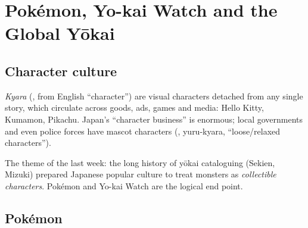\chapter{Pokémon, Yo-kai Watch and the Global Yōkai}

\section{Character culture}

\begin{definition}[Kyara]
\emph{Kyara} (, from English ``character'') are visual characters detached from
any single story, which circulate across goods, ads, games and media: Hello Kitty,
Kumamon, Pikachu. Japan's ``character business'' is enormous; local governments and even
police forces have mascot characters (, yuru-kyara, ``loose/relaxed
characters'').
\end{definition}

The theme of the last week: the long history of yōkai cataloguing (Sekien, Mizuki) prepared
Japanese popular culture to treat monsters as \emph{collectible characters}. Pokémon and
Yo-kai Watch are the logical end point.

\begin{center}
\end{center}

\section{Pokémon}

